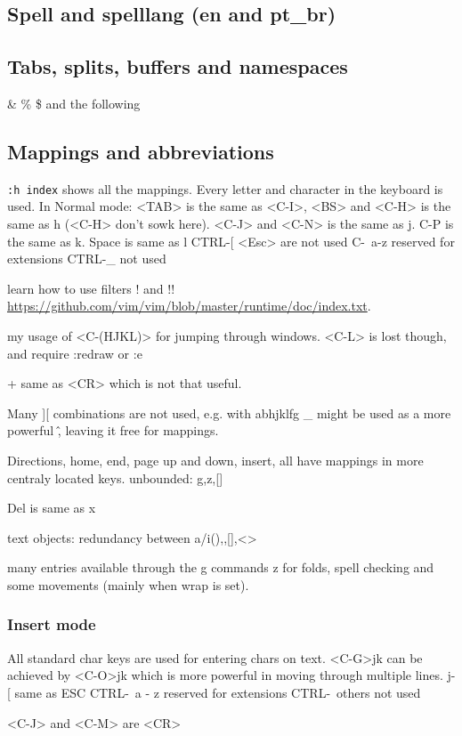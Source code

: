 \documentclass{article}
\begin{document}
\subsection{Spell and spelllang (en and pt\_br)}
\subsection{Tabs, splits, buffers and namespaces}
\& \% \$ and the following
\subsection{Mappings and abbreviations}
\texttt{:h index} shows all the mappings.
Every letter and character in the keyboard is used.
In Normal mode: <TAB> is the same as <C-I>,
<BS> and <C-H> is the same as h (<C-H> don't sowk here).
<C-J> and <C-N> is the same as j.
C-P is the same as k.
Space is same as l
CTRL-[ <Esc> are not used
C-\ a-z reserved for extensions
CTRL-\_ not used

learn how to use filters ! and !!
\url{https://github.com/vim/vim/blob/master/runtime/doc/index.txt}.

my usage of <C-(HJKL)> for jumping through windows.
<C-L> is lost though, and require :redraw or :e

+ same as <CR> which is not that useful.

Many ][ combinations are not used, e.g.
with abhjklfg
\_ might be used as a more powerful \^, leaving it free for mappings.

Directions, home, end, page up and down, insert, all have mappings
in more centraly located keys.
unbounded: g,z,[]

Del is same as x

text objects: redundancy between a/i(),{},[],<>

many entries available through the g commands
z for folds, spell checking and some movements (mainly when wrap is set).

\subsubsection{Insert mode}
All standard char keys are used for entering chars on text.
<C-G>jk can be achieved by <C-O>jk which is more powerful
in moving through multiple lines.
j-[ same as ESC
		CTRL-\ a - z	reserved for extensions
		CTRL-\ others	not used

<C-J> and <C-M> are <CR>
\end{document}

